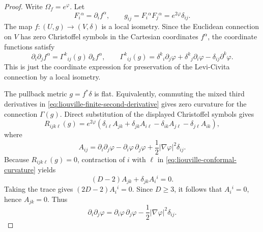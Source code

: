 \begin{proof}
Write \(\Omega_f=e^\varphi\).  Let
\[
  F_i{}^\alpha=\partial_i f^\alpha ,
  \qquad
  g_{ij}=F_i{}^\alpha F_j{}^\alpha=e^{2\varphi}\delta_{ij}.
\]
The map \(f:(U,g)\to(V,\delta)\) is a local isometry.  Since the Euclidean
connection on \(V\) has zero Christoffel symbols in the Cartesian coordinates
\(f^\alpha\), the coordinate functions satisfy
\begin{equation}
  \partial_i\partial_j f^\alpha
  =
  \Gamma^k{}_{ij}(g)\,\partial_k f^\alpha ,
  \qquad
  \Gamma^k{}_{ij}(g)
  =
  \delta^k{}_i\partial_j\varphi
  +\delta^k{}_j\partial_i\varphi
  -\delta_{ij}\partial^k\varphi .
  \label{eq:liouville-finite-second-derivative}
\end{equation}
This is just the coordinate expression for preservation of the Levi-Civita
connection by a local isometry.

The pullback metric \(g=f^*\delta\) is flat.  Equivalently, commuting the
mixed third derivatives in
\eqref{eq:liouville-finite-second-derivative} gives zero curvature for the
connection \(\Gamma(g)\).  Direct substitution of the displayed Christoffel
symbols gives
\begin{equation}
  R_{ijk\ell}(g)
  =
  e^{2\varphi}
  \left(
    \delta_{i\ell}A_{jk}
    +\delta_{jk}A_{i\ell}
    -\delta_{ik}A_{j\ell}
    -\delta_{j\ell}A_{ik}
  \right),
  \label{eq:liouville-conformal-curvature}
\end{equation}
where
\begin{equation}
  A_{ij}
  =
  \partial_i\partial_j\varphi
  -\partial_i\varphi\,\partial_j\varphi
  +\frac12|\nabla\varphi|^2\delta_{ij}.
  \label{eq:liouville-schouten-flat-condition}
\end{equation}
Because \(R_{ijk\ell}(g)=0\), contraction of \(i\) with \(\ell\) in
\eqref{eq:liouville-conformal-curvature} yields
\[
  (D-2)A_{jk}+\delta_{jk}A_i{}^i=0.
\]
Taking the trace gives \((2D-2)A_i{}^i=0\).  Since \(D\ge3\), it follows that
\(A_i{}^i=0\), hence \(A_{jk}=0\).  Thus
\begin{equation}
  \partial_i\partial_j\varphi
  =
  \partial_i\varphi\,\partial_j\varphi
  -\frac12|\nabla\varphi|^2\delta_{ij}.
  \label{eq:liouville-log-factor-equation}
\end{equation}


\end{proof}

